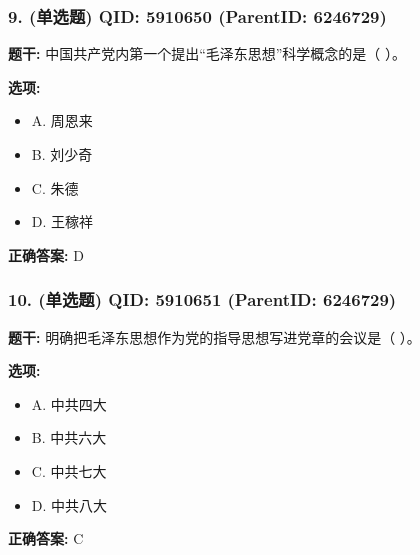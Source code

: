 \documentclass[12pt,UTF8]{ctexart}
\begin{document}
\vspace{0.3em}\hrulefill\vspace{0.7em}

\subsubsection*{9. (单选题) \small QID: 5910650 (ParentID: 6246729)}

\textbf{题干:}
中国共产党内第一个提出“毛泽东思想”科学概念的是（ ）。



\textbf{选项:}
\begin{itemize}[leftmargin=*]

  \item A. 周恩来

  \item B. 刘少奇

  \item C. 朱德

  \item D. 王稼祥

\end{itemize}

\textbf{正确答案:}
D

\vspace{0.3em}\hrulefill\vspace{0.7em}

\subsubsection*{10. (单选题) \small QID: 5910651 (ParentID: 6246729)}

\textbf{题干:}
明确把毛泽东思想作为党的指导思想写进党章的会议是（ ）。



\textbf{选项:}
\begin{itemize}[leftmargin=*]

  \item A. 中共四大

  \item B. 中共六大

  \item C. 中共七大

  \item D. 中共八大

\end{itemize}

\textbf{正确答案:}
C

\vspace{0.3em}\hrulefill\vspace{0.7em}
\end{document}
